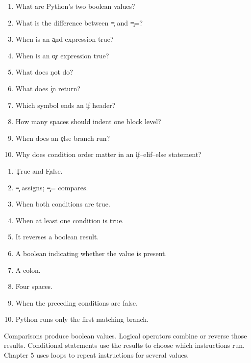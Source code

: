 
\begin{enumerate}
    \item What are Python's two boolean values?
    \item What is the difference between \c{=} and \c{==}?
    \item When is an \c{and} expression true?
    \item When is an \c{or} expression true?
    \item What does \c{not} do?
    \item What does \c{in} return?
    \item Which symbol ends an \c{if} header?
    \item How many spaces should indent one block level?
    \item When does an \c{else} branch run?
    \item Why does condition order matter in an \c{if--elif--else} statement?
\end{enumerate}


\begin{enumerate}
    \item \c{True} and \c{False}.
    \item \c{=} assigns; \c{==} compares.
    \item When both conditions are true.
    \item When at least one condition is true.
    \item It reverses a boolean result.
    \item A boolean indicating whether the value is present.
    \item A colon.
    \item Four spaces.
    \item When the preceding conditions are false.
    \item Python runs only the first matching branch.
\end{enumerate}

\begin{tcolorbox}[title=Chapter summary,colframe=orange,colback=white,arc=2mm]
Comparisons produce boolean values. Logical operators combine or reverse those
results. Conditional statements use the results to choose which instructions
run. Chapter 5 uses loops to repeat instructions for several values.
\end{tcolorbox}

